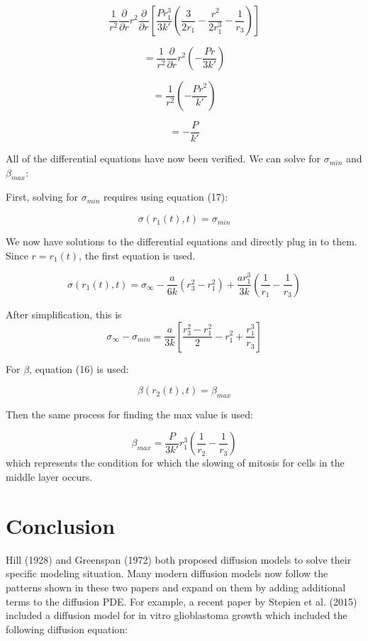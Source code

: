 \documentclass{article}
\begin{document}
$$
    \frac{1}{r^2} \frac{\partial}{\partial r} r^2 \frac{\partial}{\partial r} [\frac{Pr_1^3}{3k'}(\frac{3}{2r_1} - \frac{r^2}{2r_1^3} - \frac{1}{r_3})]
$$

$$
    = \frac{1}{r^2} \frac{\partial}{\partial r} r^2 (-\frac{Pr}{3k'})
$$

$$
    = \frac{1}{r^2} (-\frac{Pr^2}{k'})
$$

$$
    = -\frac{P}{k'}
$$

All of the differential equations have now been verified. We can solve for $\sigma_{min}$ and $\beta_{max}$:

First, solving for $\sigma_{min}$ requires using equation (17):

$$
    \sigma(r_1(t), t) = \sigma_{min}
$$

We now have solutions to the differential equations and directly plug in to them. Since $ r = r_1(t)$, the first equation is used.

$$
    \sigma(r_1(t), t) = \sigma_{\infty} - \frac{a}{6k}(r_3^2 - r_1^2) + \frac{ar_1^3}{3k} (\frac{1}{r_1} - \frac{1}{r_3})
$$

After simplification, this is
\begin{equation}
    \sigma_{\infty} - \sigma_{min} = \frac{a}{3k}[\frac{r_3^2-r_1^2}{2} - r_1^2 + \frac{r_1^3}{r_3}]
\end{equation}

For $\beta$, equation (16) is used:

$$
    \beta(r_2(t), t) = \beta_{max}
$$

Then the same process for finding the max value is used:

\begin{equation}
    \beta_{max} = \frac{P}{3k'}r_1^3(\frac{1}{r_2}-\frac{1}{r_3})
\end{equation}
which represents the condition for which the slowing of mitosis for cells in the middle layer occurs.

\section{Conclusion}

Hill (1928) and Greenspan (1972) both proposed diffusion models to solve their specific modeling situation.
Many modern diffusion models now follow the patterns shown in these two papers and expand on them by adding additional
terms to the diffusion PDE. For example, a recent paper by Stepien et al. (2015) included a diffusion model for in vitro
glioblastoma growth which included the following diffusion equation:
\end{document}
